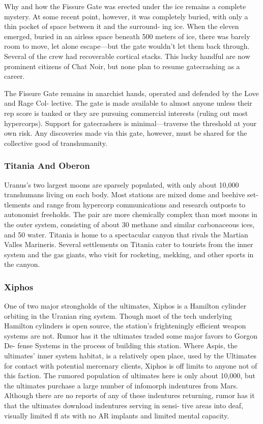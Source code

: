 Why and how the Fissure Gate was erected under 
the ice remains a complete mystery. At some recent 
point, however, it was completely buried, with only 
a thin pocket of space between it and the surround-
ing ice. When the eleven emerged, buried in an 
airless space beneath 500 meters of ice, there was 
barely room to move, let alone escape—but the gate 
wouldn't let them back through. Several of the crew 
had recoverable cortical stacks. This lucky handful are 
now prominent citizens of Chat Noir, but none plan 
to resume gatecrashing as a career.

The Fissure Gate remains in anarchist hands, 
operated and defended by the Love and Rage Col-
lective. The gate is made available to almost anyone 
unless their rep score is tanked or they are pursuing 
commercial interests (ruling out most hypercorps). 
Support for gatecrashers is minimal—traverse the 
threshold at your own risk. Any discoveries made via 
this gate, however, must be shared for the collective 
good of transhumanity.

\subsubsection{Titania And Oberon}

Uranus's two largest moons are sparsely populated, 
with only about 10,000 transhumans living on each 
body. Most stations are mixed dome and beehive set-
tlements and range from hypercorp communications 
and research outposts to autonomist freeholds. The 
pair are more chemically complex than most moons in 
the outer system, consisting of about 30%
methane and similar carbonaceous ices, and 50%
water. Titania is home to a spectacular canyon that 
rivals the Martian Valles Marineris. Several settlements 
on Titania cater to tourists from the inner system and 
the gas giants, who visit for rocketing, mekking, and 
other sports in the canyon.

\subsubsection{Xiphos}

One of two major strongholds of the ultimates, Xiphos 
is a Hamilton cylinder orbiting in the Uranian ring 
system. Though most of the tech underlying Hamilton 
cylinders is open source, the station's frighteningly 
efficient weapon systems are not. Rumor has it the 
ultimates traded some major favors to Gorgon De-
fense Systems in the process of building this station. 
Where Aspis, the ultimates' inner system habitat, 
is a relatively open place, used by the Ultimates for 
contact with potential mercenary clients, Xiphos is 
off limits to anyone not of this faction. The rumored 
population of ultimates here is only about 10,000, but 
the ultimates purchase a large number of infomorph 
indentures from Mars. Although there are no reports 
of any of these indentures returning, rumor has it that 
the ultimates download indentures serving in sensi-
tive areas into deaf, visually limited fl ats with no AR 
implants and limited mental capacity.

